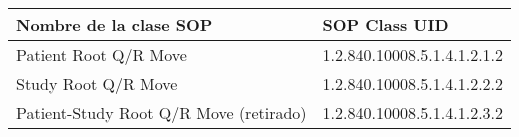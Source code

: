 \begin{tabular}{|l|l|}
\hline
\textbf{Nombre de la clase SOP}        & \textbf{SOP Class UID}      \\ \hline
Patient Root Q/R Move                  & 1.2.840.10008.5.1.4.1.2.1.2 \\ \hline
Study Root Q/R Move                    & 1.2.840.10008.5.1.4.1.2.2.2 \\ \hline
Patient-Study Root Q/R Move (retirado) & 1.2.840.10008.5.1.4.1.2.3.2 \\ \hline
\end{tabular}
